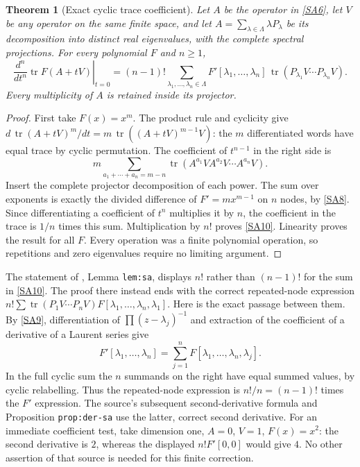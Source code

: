 \documentclass[11pt]{article}
\newcommand{\tr}{\operatorname{tr}}\newcommand{\Res}{\operatorname{Res}}
\newtheorem{theorem}{Theorem}[section]
\begin{document}
\begin{theorem}[Exact cyclic trace coefficient]\label{thm:cyclic}
Let $A$ be the operator in \eqref{SA6}, let $V$ be any
operator on the same finite space, and let
$A=\sum_{\lambda\in\Lambda}\lambda P_\lambda$ be its
decomposition into distinct real eigenvalues, with the
complete spectral projections. For every polynomial $F$
and $n\geq1$,
\begin{equation}\tag{SA10}\label{SA10}
\left.\frac{d^n}{dt^n}\tr F(A+tV)\right|_{t=0}
=(n-1)!\sum_{\lambda_1,\ldots,\lambda_n\in\Lambda}
F'[\lambda_1,\ldots,\lambda_n]\,
\tr(P_{\lambda_1}V\cdots P_{\lambda_n}V).
\end{equation}
Every multiplicity of $A$ is retained inside its projector.
\end{theorem}
\begin{proof}
First take $F(x)=x^m$. The product rule and cyclicity give
$d\,\tr(A+tV)^m/dt=m\,\tr((A+tV)^{m-1}V)$:
the $m$ differentiated words have equal trace by cyclic
permutation. The coefficient of $t^{n-1}$ in the right
side is
\[
m\sum_{a_1+\cdots+a_n=m-n}
\tr(A^{a_1}V A^{a_2}V\cdots A^{a_n}V).
\]
Insert the complete projector decomposition of each power.
The sum over exponents is exactly the divided difference
of $F'=mx^{m-1}$ on $n$ nodes, by \eqref{SA8}.
Since differentiating a coefficient of $t^n$ multiplies
it by $n$, the coefficient in the trace is $1/n$ times
this sum. Multiplication by $n!$ proves \eqref{SA10}.
Linearity proves the result for all $F$. Every operation
was a finite polynomial operation, so repetitions and
zero eigenvalues require no limiting argument.
\end{proof}

The statement of \cite{CV}, Lemma \texttt{lem:sa}, displays
$n!$ rather than $(n-1)!$ for the sum in \eqref{SA10}.
The proof there instead ends with the correct repeated-node
expression
$n!\sum\tr(P_1V\cdots P_nV)F[\lambda_1,\ldots,\lambda_n,\lambda_1]$.
Here is the exact passage between them. By \eqref{SA9},
differentiation of $\prod(z-\lambda_j)^{-1}$ and extraction
of the coefficient of a derivative of a Laurent series give
\begin{equation}\tag{SA11}\label{SA11}
F'[\lambda_1,\ldots,\lambda_n]
=\sum_{j=1}^n
F[\lambda_1,\ldots,\lambda_n,\lambda_j].
\end{equation}
In the full cyclic sum the $n$ summands on the right
have equal summed values, by cyclic relabelling.
Thus the repeated-node expression is $n!/n=(n-1)!$
times the $F'$ expression. The source's subsequent
second-derivative formula and Proposition
\texttt{prop:der-sa} use the latter, correct second
derivative. For an immediate coefficient test, take
dimension one, $A=0$, $V=1$, $F(x)=x^2$: the second
derivative is $2$, whereas the displayed $n!F'[0,0]$
would give $4$. No other assertion of that source is
needed for this finite correction.
\end{document}
